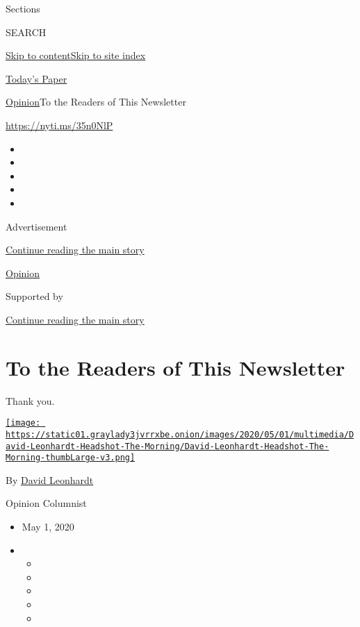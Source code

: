 Sections

SEARCH

\protect\hyperlink{site-content}{Skip to
content}\protect\hyperlink{site-index}{Skip to site index}

\href{https://myaccount.nytimes3xbfgragh.onion/auth/login?response_type=cookie\&client_id=vi}{}

\href{https://www.nytimes3xbfgragh.onion/section/todayspaper}{Today's
Paper}

\href{/section/opinion}{Opinion}\textbar{}To the Readers of This
Newsletter

\url{https://nyti.ms/35n0NlP}

\begin{itemize}
\item
\item
\item
\item
\item
\end{itemize}

Advertisement

\protect\hyperlink{after-top}{Continue reading the main story}

\href{/section/opinion}{Opinion}

Supported by

\protect\hyperlink{after-sponsor}{Continue reading the main story}

\hypertarget{to-the-readers-of-this-newsletter}{%
\section{To the Readers of This
Newsletter}\label{to-the-readers-of-this-newsletter}}

Thank you.

\href{https://www.nytimes3xbfgragh.onion/by/david-leonhardt}{\texttt{[image: https://static01.graylady3jvrrxbe.onion/images/2020/05/01/multimedia/David-Leonhardt-Headshot-The-Morning/David-Leonhardt-Headshot-The-Morning-thumbLarge-v3.png]}}

By \href{https://www.nytimes3xbfgragh.onion/by/david-leonhardt}{David
Leonhardt}

Opinion Columnist

\begin{itemize}
\item
  May 1, 2020
\item
  \begin{itemize}
  \item
  \item
  \item
  \item
  \item
  \end{itemize}
\end{itemize}

